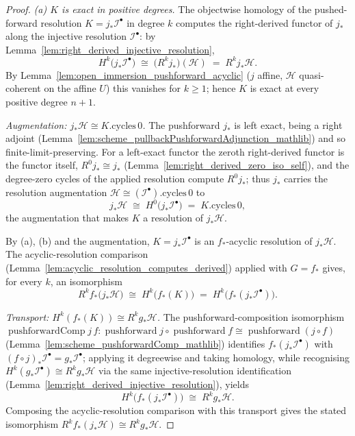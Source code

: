 \begin{proof}
  \emph{(a) \(K\) is exact in positive degrees.} The objectwise homology of the pushed-forward
  resolution \(K = j_*\mathcal{I}^\bullet\) in degree \(k\) computes the right-derived functor of
  \(j_*\) along the injective resolution \(\mathcal{I}^\bullet\): by
  Lemma~\ref{lem:right_derived_injective_resolution},
  \[
    H^k\bigl(j_*\mathcal{I}^\bullet\bigr) \;\cong\; \bigl(R^k j_*\bigr)(\mathcal{H})
      \;=\; R^k j_*\mathcal{H}.
  \]
  By Lemma~\ref{lem:open_immersion_pushforward_acyclic} (\(j\) affine, \(\mathcal{H}\) quasi-coherent
  on the affine \(U\)) this vanishes for \(k \geq 1\); hence \(K\) is exact at every positive degree
  \(n+1\).

  \emph{Augmentation: \(j_*\mathcal{H} \cong K.\mathrm{cycles}\,0\).} The pushforward \(j_*\) is left
  exact, being a right adjoint (Lemma~\ref{lem:scheme_pullbackPushforwardAdjunction_mathlib}) and so
  finite-limit-preserving. For a left-exact functor the zeroth right-derived functor is the functor
  itself, \(R^0 j_* \cong j_*\) (Lemma~\ref{lem:right_derived_zero_iso_self}), and the degree-zero
  cycles of the applied resolution compute \(R^0 j_*\); thus \(j_*\) carries the resolution
  augmentation \(\mathcal{H} \cong (\mathcal{I}^\bullet).\mathrm{cycles}\,0\) to
  \[
    j_*\mathcal{H} \;\cong\; H^0\bigl(j_*\mathcal{I}^\bullet\bigr)
      \;=\; K.\mathrm{cycles}\,0,
  \]
  the augmentation that makes \(K\) a resolution of \(j_*\mathcal{H}\).

  By (a), (b) and the augmentation, \(K = j_*\mathcal{I}^\bullet\) is an \(f_*\)-acyclic resolution
  of \(j_*\mathcal{H}\). The acyclic-resolution comparison
  (Lemma~\ref{lem:acyclic_resolution_computes_derived}) applied with \(G = f_*\) gives, for every
  \(k\), an isomorphism
  \[
    R^k f_*\bigl(j_*\mathcal{H}\bigr) \;\cong\; H^k\bigl(f_*(K)\bigr)
      \;=\; H^k\bigl(f_*(j_*\mathcal{I}^\bullet)\bigr).
  \]

  \emph{Transport: \(H^k(f_*(K)) \cong R^k g_*\mathcal{H}\).} The pushforward-composition isomorphism
  \(\operatorname{pushforwardComp} j\,f : \operatorname{pushforward} j \circ \operatorname{pushforward}
  f \cong \operatorname{pushforward}(j \circ f)\) (Lemma~\ref{lem:scheme_pushforwardComp_mathlib})
  identifies \(f_*(j_*\mathcal{I}^\bullet)\) with \((f \circ j)_*\mathcal{I}^\bullet = g_*\mathcal{I}^
  \bullet\); applying it degreewise and taking homology, while recognising \(H^k(g_*\mathcal{I}^
  \bullet) \cong R^k g_*\mathcal{H}\) via the same injective-resolution identification
  (Lemma~\ref{lem:right_derived_injective_resolution}), yields
  \[
    H^k\bigl(f_*(j_*\mathcal{I}^\bullet)\bigr) \;\cong\; R^k g_*\mathcal{H}.
  \]
  Composing the acyclic-resolution comparison with this transport gives the stated isomorphism
  \(R^k f_*(j_*\mathcal{H}) \cong R^k g_*\mathcal{H}\).
\end{proof}

